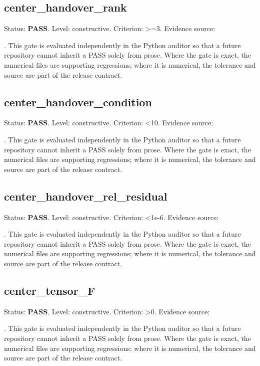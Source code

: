 \documentclass[11pt,a4paper,oneside]{book}
\begin{document}
\subsection{center\_handover\_rank}
Status: \textbf{PASS}. Level: constructive. Criterion: >=3. Evidence source:\par\noindent{}. This gate is evaluated independently in the Python auditor so that a future repository cannot inherit a PASS solely from prose. Where the gate is exact, the numerical files are supporting regressions; where it is numerical, the tolerance and source are part of the release contract.\par

\subsection{center\_handover\_condition}
Status: \textbf{PASS}. Level: constructive. Criterion: <10. Evidence source:\par\noindent{}. This gate is evaluated independently in the Python auditor so that a future repository cannot inherit a PASS solely from prose. Where the gate is exact, the numerical files are supporting regressions; where it is numerical, the tolerance and source are part of the release contract.\par

\subsection{center\_handover\_rel\_residual}
Status: \textbf{PASS}. Level: constructive. Criterion: <1e-6. Evidence source:\par\noindent{}. This gate is evaluated independently in the Python auditor so that a future repository cannot inherit a PASS solely from prose. Where the gate is exact, the numerical files are supporting regressions; where it is numerical, the tolerance and source are part of the release contract.\par

\subsection{center\_tensor\_F}
Status: \textbf{PASS}. Level: constructive. Criterion: >0. Evidence source:\par\noindent{}. This gate is evaluated independently in the Python auditor so that a future repository cannot inherit a PASS solely from prose. Where the gate is exact, the numerical files are supporting regressions; where it is numerical, the tolerance and source are part of the release contract.\par
\end{document}
